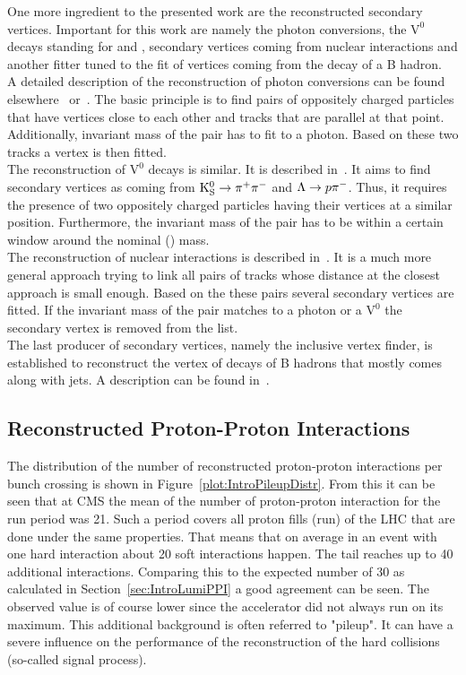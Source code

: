 One more ingredient to the presented work are the reconstructed secondary vertices. Important for this work are namely the photon conversions, the $\text{V}^{\text{0}}$ decays standing for \PKzS{} and \PgL{}, secondary vertices coming from nuclear interactions and another fitter tuned to the fit of vertices coming from the decay of a B hadron. \\
A detailed description of the reconstruction of photon conversions can be found elsewhere~\cite{GiordanoConversion} or~\cite{CMS-PAS-EGM-10-005}. The basic principle is to find pairs of oppositely charged particles that have vertices close to each other and tracks that are parallel at that point. Additionally, invariant mass of the pair has to fit to a photon. Based on these two tracks a vertex is then fitted. \\
The reconstruction of $\text{V}^{\text{0}}$ decays is similar. It is described in~. It aims to find secondary vertices as coming from $\mathrm{K}^0_\mathrm{S}{} \rightarrow{} \pi{}^{+}{}\pi{}^{-}{}$ and $\Lambda{}{} \rightarrow{} p\pi{}^{-}{}$. Thus, it requires the presence of two oppositely charged particles having their vertices at a similar position. Furthermore, the invariant mass of the pair has to be within a certain window around the nominal \PKzS{} (\PgL{}) mass. \\
The reconstruction of nuclear interactions is described in~. It is a much more general approach trying to link all pairs of tracks whose distance at the closest approach is small enough. Based on the these pairs several secondary vertices are fitted. If the invariant mass of the pair matches to a photon or a $\text{V}^{\text{0}}$ the secondary vertex is removed from the list. \\
The last producer of secondary vertices, namely the inclusive vertex finder, is established to reconstruct the vertex of decays of B hadrons that mostly comes along with jets. A description can be found in~.


\subsection{Reconstructed Proton-Proton Interactions}

The distribution of the number of reconstructed proton-proton interactions per bunch crossing is shown in Figure~\ref{plot:IntroPileupDistr}. From this it can be seen that at CMS the mean of the number of proton-proton interaction for the run period was 21. Such a period covers all proton fills (run) of the LHC that are done under the same properties. That means that on average in an event with one hard interaction about 20 soft interactions happen. The tail reaches up to 40 additional interactions. Comparing this to the expected number of 30 as calculated in Section~\ref{sec:IntroLumiPPI} a good agreement can be seen. The observed value is of course lower since the accelerator did not always run on its maximum. This additional background is often referred to "pileup". It can have a severe influence on the performance of the reconstruction of the hard collisions (so-called signal process).

